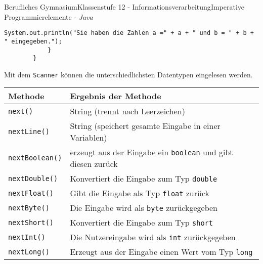 \documentclass[oneside,openany,headings=optiontotoc,11pt,numbers=noenddot]{article}
\begin{document}
\begin{worksheet}{Berufliches Gymnasium}{Klassenstufe 12 - Informationsverarbeitung}{Imperative Programmierelemente - \textit{Java}}
\begin{lstlisting}[style=JavaInputStyle]
				System.out.println("Sie haben die Zahlen a =" + a + " und b = " + b + " eingegeben.");
			}
		}
		\end{lstlisting}
		Mit dem \lstinline[style=JavaInputStyle]|Scanner| können die unterschiedlichsten Datentypen eingelesen werden.\\
		\par\noindent
		\begin{tabularx}{\textwidth}{|X|X|}
			\hline
			\textbf{Methode} & \textbf{Ergebnis der Methode}\\
			\hline
			\hline
			{\lstinline[style=JavaInputStyle]|next()|} & String (trennt nach Leerzeichen)\\
			\hline
			{\lstinline[style=JavaInputStyle]|nextLine()|} & String (speichert gesamte Eingabe in einer Variablen)\\
			\hline
			\hline
			{\lstinline[style=JavaInputStyle]|nextBoolean()|} & erzeugt aus der Eingabe ein {\lstinline[style=JavaInputStyle]|boolean|} und gibt diesen zurück\\
			\hline
			\hline
			{\lstinline[style=JavaInputStyle]|nextDouble()|} & Konvertiert die Eingabe zum Typ {\lstinline[style=JavaInputStyle]|double|}\\
			\hline
			{\lstinline[style=JavaInputStyle]|nextFloat()|} & Gibt die Eingabe als Typ {\lstinline[style=JavaInputStyle]|float|} zurück\\
			\hline
			\hline
			{\lstinline[style=JavaInputStyle]|nextByte()|} & Die Eingabe wird als {\lstinline[style=JavaInputStyle]|byte|} zurückgegeben\\
			\hline
			{\lstinline[style=JavaInputStyle]|nextShort()|} & Konvertiert die Eingabe zum Typ {\lstinline[style=JavaInputStyle]|short|}\\
			\hline
			{\lstinline[style=JavaInputStyle]|nextInt()|} & Die Nutzereingabe wird als {\lstinline[style=JavaInputStyle]|int|} zurückgegeben\\
			\hline
			{\lstinline[style=JavaInputStyle]|nextLong()|} & Erzeugt aus der Eingabe einen Wert vom Typ {\lstinline[style=JavaInputStyle]|long|}\\
			\hline
		\end{tabularx}\\
		\par\noindent

\end{worksheet}
\end{document}
